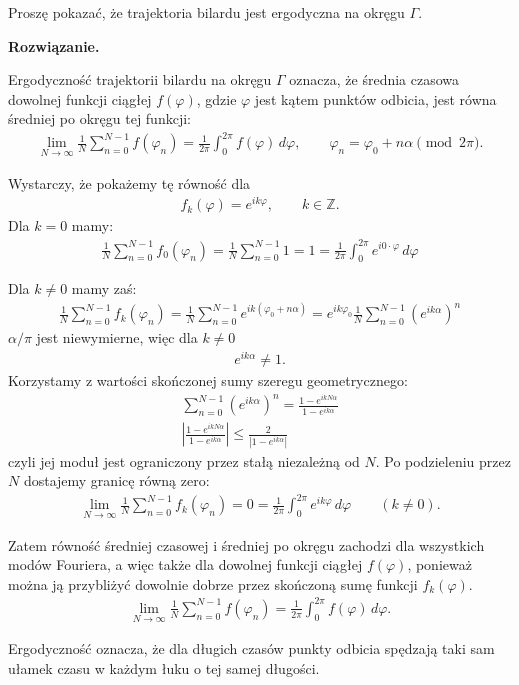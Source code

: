 \documentclass[11pt,a4paper]{article}
\newenvironment{solution}{\vspace{1cm} \par\textbf{Rozwiązanie.} \vspace{1cm}}{}
\begin{document}
Proszę pokazać, że trajektoria bilardu jest ergodyczna na okręgu $\Gamma$.


\begin{solution}

Ergodyczność trajektorii bilardu na okręgu $\Gamma$ 
oznacza, że średnia czasowa dowolnej funkcji ciągłej 
$f(\varphi)$, gdzie $\varphi$ jest kątem punktów odbicia, 
jest równa średniej po okręgu tej funkcji:
\begin{align*}
  \lim_{N\to\infty}\frac{1}{N}\sum_{n=0}^{N-1} f(\varphi_n)
  = \frac{1}{2\pi}\int_0^{2\pi} f(\varphi)\,d\varphi, \qquad \varphi_n = \varphi_0 + n\alpha \pmod{2\pi}.
\end{align*}

Wystarczy, że pokażemy tę równość dla 
\begin{align*}
  f_k(\varphi)=e^{ik\varphi}, \qquad k\in\mathbb{Z}.
\end{align*}
Dla $k=0$ mamy:
\begin{align*}
  \frac{1}{N}\sum_{n=0}^{N-1} f_0(\varphi_n)
  = \frac{1}{N}\sum_{n=0}^{N-1} 1
  = 1
  = \frac{1}{2\pi}\int_0^{2\pi} e^{i0\cdot\varphi}\,d\varphi
\end{align*}

Dla $k\neq 0$ mamy zaś:
\begin{align*}
  \frac{1}{N}\sum_{n=0}^{N-1} f_k(\varphi_n)
  = \frac{1}{N}\sum_{n=0}^{N-1} e^{ik(\varphi_0+n\alpha)}
  = e^{ik\varphi_0}\frac{1}{N}\sum_{n=0}^{N-1} \left(e^{ik\alpha}\right)^n
\end{align*}
$\alpha/\pi$ jest niewymierne, więc dla $k\neq 0$
\begin{align*}
  e^{ik\alpha}\neq 1.
\end{align*}
Korzystamy z wartości skończonej sumy szeregu geometrycznego:
\begin{align*}
  \sum_{n=0}^{N-1} \left(e^{ik\alpha}\right)^n
  = \frac{1-e^{ikN\alpha}}{1-e^{ik\alpha}} \\
  \left|\frac{1-e^{ikN\alpha}}{1-e^{ik\alpha}}\right|
  \leq \frac{2}{|1-e^{ik\alpha}|}
\end{align*}
czyli jej moduł jest ograniczony przez stałą niezależną od $N$. Po podzieleniu przez
$N$ dostajemy granicę równą zero:
\begin{align*}
  \lim_{N\to\infty}\frac{1}{N}\sum_{n=0}^{N-1} f_k(\varphi_n)=0
  = \frac{1}{2\pi}\int_0^{2\pi} e^{ik\varphi}\,d\varphi
  \qquad (k\neq 0).
\end{align*}

Zatem równość średniej czasowej i średniej po okręgu zachodzi dla wszystkich modów
Fouriera, a więc także dla dowolnej funkcji ciągłej $f(\varphi)$, 
ponieważ można ją przybliżyć dowolnie dobrze przez skończoną sumę 
funkcji $f_k(\varphi)$.
\begin{align*}
  \lim_{N\to\infty}\frac{1}{N}\sum_{n=0}^{N-1} f(\varphi_n)
  = \frac{1}{2\pi}\int_0^{2\pi} f(\varphi)\,d\varphi.
\end{align*}

Ergodyczność oznacza, że dla długich czasów
punkty odbicia spędzają taki sam ułamek czasu w każdym łuku o tej 
samej długości.

\newpage   
\end{solution}
\end{document}
